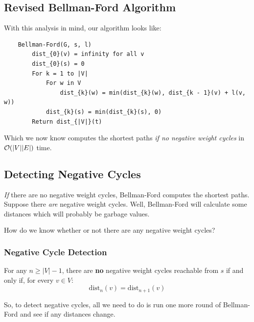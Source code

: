 \documentclass[letterpaper]{article}
\begin{document}
\subsection{Revised Bellman-Ford Algorithm}
With this analysis in mind, our algorithm looks like: 
\begin{verbatim}
    Bellman-Ford(G, s, l)
        dist_{0}(v) = infinity for all v 
        dist_{0}(s) = 0
        For k = 1 to |V|
            For w in V
                dist_{k}(w) = min(dist_{k}(w), dist_{k - 1}(v) + l(v, w))
            dist_{k}(s) = min(dist_{k}(s), 0)
        Return dist_{|V|}(t)
\end{verbatim}
Which we now know computes the shortest paths \emph{if no negative weight cycles} in $\mathcal{O}(|V||E|)$ time. 

\subsection{Detecting Negative Cycles}
\emph{If} there are no negative weight cycles, Bellman-Ford computes the shortest paths. Suppose there \emph{are} negative weight cycles. Well, Bellman-Ford will calculate some distances which will probably be garbage values.

\bigskip 

How do we know whether or not there are any negative weight cycles? 

\subsubsection{Negative Cycle Detection}
\begin{proposition}
    For any $n \geq |V| - 1$, there are \textbf{no} negative weight cycles reachable from $s$ if and only if, for every $v \in V$:
    \[\text{dist}_{n}(v) = \text{dist}_{n + 1}(v)\]
\end{proposition}
So, to detect negative cycles, all we need to do is run one more round of Bellman-Ford and see if any distances change. 
\end{document}
